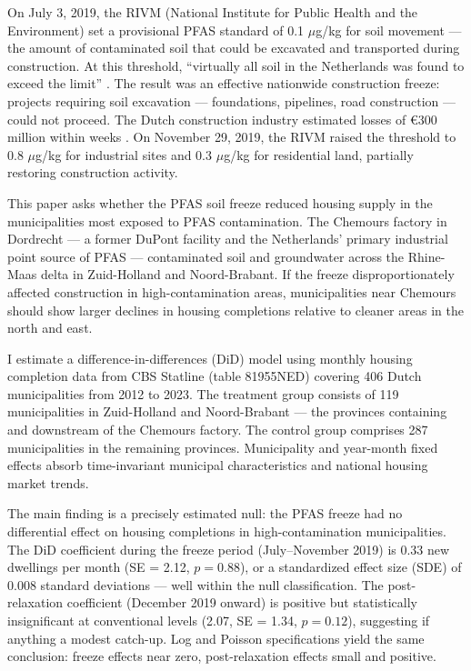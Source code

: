 \documentclass[12pt]{article}
\begin{document}
On July 3, 2019, the RIVM (National Institute for Public Health and the Environment) set a provisional PFAS standard of 0.1 $\mu$g/kg for soil movement --- the amount of contaminated soil that could be excavated and transported during construction. At this threshold, ``virtually all soil in the Netherlands was found to exceed the limit'' \citep{leerschool2021pfas}. The result was an effective nationwide construction freeze: projects requiring soil excavation --- foundations, pipelines, road construction --- could not proceed. The Dutch construction industry estimated losses of \euro{}300 million within weeks \citep{bouwend2019pfas}. On November 29, 2019, the RIVM raised the threshold to 0.8 $\mu$g/kg for industrial sites and 0.3 $\mu$g/kg for residential land, partially restoring construction activity.

This paper asks whether the PFAS soil freeze reduced housing supply in the municipalities most exposed to PFAS contamination. The Chemours factory in Dordrecht --- a former DuPont facility and the Netherlands' primary industrial point source of PFAS --- contaminated soil and groundwater across the Rhine-Maas delta in Zuid-Holland and Noord-Brabant. If the freeze disproportionately affected construction in high-contamination areas, municipalities near Chemours should show larger declines in housing completions relative to cleaner areas in the north and east.

I estimate a difference-in-differences (DiD) model using monthly housing completion data from CBS Statline (table 81955NED) covering 406 Dutch municipalities from 2012 to 2023. The treatment group consists of 119 municipalities in Zuid-Holland and Noord-Brabant --- the provinces containing and downstream of the Chemours factory. The control group comprises 287 municipalities in the remaining provinces. Municipality and year-month fixed effects absorb time-invariant municipal characteristics and national housing market trends.

The main finding is a precisely estimated null: the PFAS freeze had no differential effect on housing completions in high-contamination municipalities. The DiD coefficient during the freeze period (July--November 2019) is 0.33 new dwellings per month (SE = 2.12, $p = 0.88$), or a standardized effect size (SDE) of 0.008 standard deviations --- well within the null classification. The post-relaxation coefficient (December 2019 onward) is positive but statistically insignificant at conventional levels (2.07, SE = 1.34, $p = 0.12$), suggesting if anything a modest catch-up. Log and Poisson specifications yield the same conclusion: freeze effects near zero, post-relaxation effects small and positive.
\end{document}
